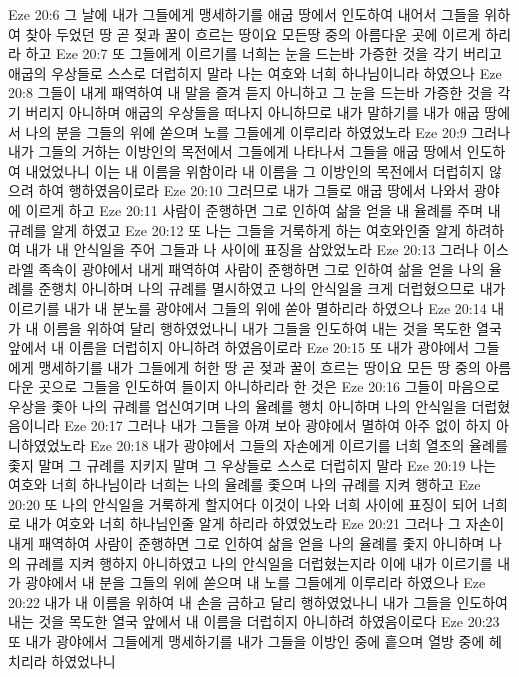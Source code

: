 Eze 20:6  그 날에 내가 그들에게 맹세하기를 애굽 땅에서 인도하여 내어서 그들을 위하여 찾아 두었던 땅 곧 젖과 꿀이 흐르는 땅이요 모든땅 중의 아름다운 곳에 이르게 하리라 하고
Eze 20:7  또 그들에게 이르기를 너희는 눈을 드는바 가증한 것을 각기 버리고 애굽의 우상들로 스스로 더럽히지 말라 나는 여호와 너희 하나님이니라 하였으나
Eze 20:8  그들이 내게 패역하여 내 말을 즐겨 듣지 아니하고 그 눈을 드는바 가증한 것을 각기 버리지 아니하며 애굽의 우상들을 떠나지 아니하므로 내가 말하기를 내가 애굽 땅에서 나의 분을 그들의 위에 쏟으며 노를 그들에게 이루리라 하였었노라
Eze 20:9  그러나 내가 그들의 거하는 이방인의 목전에서 그들에게 나타나서 그들을 애굽 땅에서 인도하여 내었었나니 이는 내 이름을 위함이라 내 이름을 그 이방인의 목전에서 더럽히지 않으려 하여 행하였음이로라
Eze 20:10  그러므로 내가 그들로 애굽 땅에서 나와서 광야에 이르게 하고
Eze 20:11  사람이 준행하면 그로 인하여 삶을 얻을 내 율례를 주며 내 규례를 알게 하였고
Eze 20:12  또 나는 그들을 거룩하게 하는 여호와인줄 알게 하려하여 내가 내 안식일을 주어 그들과 나 사이에 표징을 삼았었노라
Eze 20:13  그러나 이스라엘 족속이 광야에서 내게 패역하여 사람이 준행하면 그로 인하여 삶을 얻을 나의 율례를 준행치 아니하며 나의 규례를 멸시하였고 나의 안식일을 크게 더럽혔으므로 내가 이르기를 내가 내 분노를 광야에서 그들의 위에 쏟아 멸하리라 하였으나
Eze 20:14  내가 내 이름을 위하여 달리 행하였었나니 내가 그들을 인도하여 내는 것을 목도한 열국 앞에서 내 이름을 더럽히지 아니하려 하였음이로라
Eze 20:15  또 내가 광야에서 그들에게 맹세하기를 내가 그들에게 허한 땅 곧 젖과 꿀이 흐르는 땅이요 모든 땅 중의 아름다운 곳으로 그들을 인도하여 들이지 아니하리라 한 것은
Eze 20:16  그들이 마음으로 우상을 좇아 나의 규례를 업신여기며 나의 율례를 행치 아니하며 나의 안식일을 더럽혔음이니라
Eze 20:17  그러나 내가 그들을 아껴 보아 광야에서 멸하여 아주 없이 하지 아니하였었노라
Eze 20:18  내가 광야에서 그들의 자손에게 이르기를 너희 열조의 율례를 좇지 말며 그 규례를 지키지 말며 그 우상들로 스스로 더럽히지 말라
Eze 20:19  나는 여호와 너희 하나님이라 너희는 나의 율례를 좇으며 나의 규례를 지켜 행하고
Eze 20:20  또 나의 안식일을 거룩하게 할지어다 이것이 나와 너희 사이에 표징이 되어 너희로 내가 여호와 너희 하나님인줄 알게 하리라 하였었노라
Eze 20:21  그러나 그 자손이 내게 패역하여 사람이 준행하면 그로 인하여 삶을 얻을 나의 율례를 좇지 아니하며 나의 규례를 지켜 행하지 아니하였고 나의 안식일을 더럽혔는지라 이에 내가 이르기를 내가 광야에서 내 분을 그들의 위에 쏟으며 내 노를 그들에게 이루리라 하였으나
Eze 20:22  내가 내 이름을 위하여 내 손을 금하고 달리 행하였었나니 내가 그들을 인도하여 내는 것을 목도한 열국 앞에서 내 이름을 더럽히지 아니하려 하였음이로다
Eze 20:23  또 내가 광야에서 그들에게 맹세하기를 내가 그들을 이방인 중에 흩으며 열방 중에 헤치리라 하였었나니
